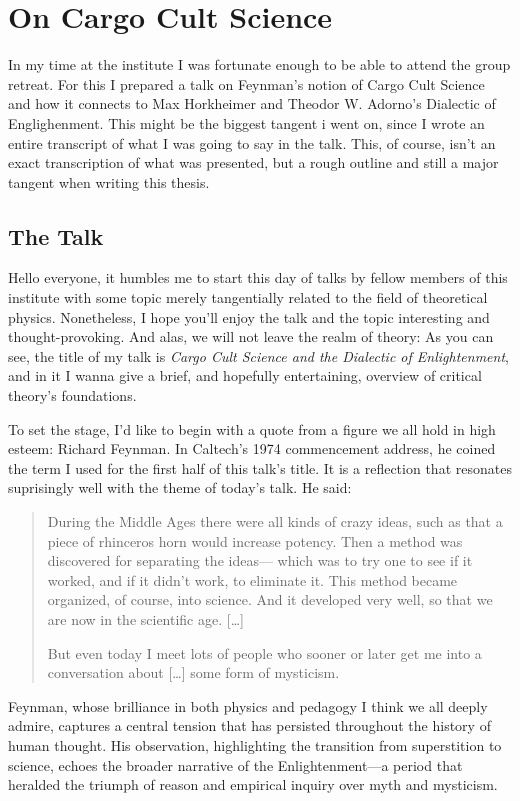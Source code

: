 \section*{On Cargo Cult Science}
In my time at the institute I was fortunate enough to be able to attend the
group retreat. For this I prepared a talk on Feynman's notion of Cargo Cult
Science and how it connects to Max Horkheimer and Theodor W. Adorno's Dialectic
of Englighenment. This might be the biggest tangent i went on, since I wrote an
entire transcript of what I was going to say in the talk. This, of course,
isn't an exact transcription of what was presented, but a rough outline and
still a major tangent when writing this thesis.

\subsection*{The Talk}
Hello everyone, it humbles me to start this day of talks by fellow members of
this institute with some topic merely tangentially related to the field of
theoretical physics. Nonetheless, I hope you'll enjoy the talk and the topic interesting
and thought-provoking. 
And alas, we will not leave the realm of theory: As you
can see, the title of my talk is \emph{Cargo Cult Science and the Dialectic of
Enlightenment}, and in it I wanna give a brief, and hopefully entertaining,
overview of critical theory's foundations.

To set the stage, I’d like to begin with a quote from a figure we all hold in
high esteem: Richard Feynman. In Caltech’s 1974 commencement address, he coined
the term I used for the first half of this talk's title. It is
a reflection that resonates suprisingly well with the theme of today’s talk. He said:
\blockquote{
  During the Middle Ages there were all kinds of crazy ideas, such as that a
  piece of rhinceros horn would increase potency. Then a method was discovered
  for separating the ideas--- which was to try one to see if it worked, and if
  it didn't work, to eliminate it. This method became organized, of course,
  into science. And it developed very well, so that we are now in the
  scientific age. [\ldots]

  But even today I meet lots of people who sooner or later get me into a
  conversation about [\ldots] some form of mysticism.
}

Feynman, whose brilliance in both physics and pedagogy I think we all deeply admire,
captures a central tension that has persisted throughout the history of human
thought. His observation, highlighting the transition from superstition to
science, echoes the broader narrative of the Enlightenment---a period that
heralded the triumph of reason and empirical inquiry over myth and mysticism.

